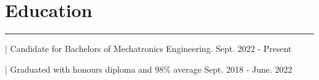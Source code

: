 \documentclass{article}
\begin{document}







\vspace{-0.5cm}
\section*{\hspace{0.4cm} \large Education}
\begin{center}
    \vspace{-0.5cm}
    \rule{\textwidth}{0.1pt}
\end{center}


\begin{description}
    \vspace{-0.5cm}
    \item[\hspace{0.6cm}University of Waterloo] | Candidate for Bachelors of Mechatronics Engineering. \hspace{2.3cm} {\small Sept. 2022 - Present}
    \vspace{-0.2cm}
    \item[\hspace{0.6cm}Secondary School ] | Graduated with honours diploma and 98\% average \hspace{3.1cm} {\small Sept. 2018 - June. 2022}
\end{description}



\vspace{0.5cm}
\end{document}
